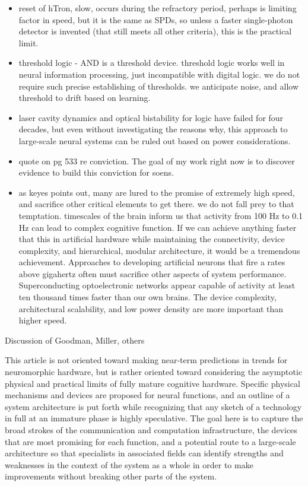 \begin{itemize}
\item reset of hTron, slow, occurs during the refractory period, perhaps is limiting factor in speed, but it is the same as SPDs, so unless a faster single-photon detector is invented (that still meets all other criteria), this is the practical limit.
\item threshold logic - AND is a threshold device. threshold logic works well in neural information processing, just incompatible with digital logic. we do not require such precise establishing of thresholds. we anticipate noise, and allow threshold to drift based on learning. 
\item laser cavity dynamics and optical bistability for logic have failed for four decades, but even without investigating the reasons why, this approach to large-scale neural systems can be ruled out based on power considerations. 
\item \cite{ke1985b} quote on pg 533 re conviction. The goal of my work right now is to discover evidence to build this conviction for soens.
\item as keyes points out, many are lured to the promise of extremely high speed, and sacrifice other critical elements to get there. we do not fall prey to that temptation. timescales of the brain inform us that activity from 100 Hz to 0.1 Hz can lead to complex cognitive function. If we can achieve anything faster that this in artificial hardware while maintaining the connectivity, device complexity, and hierarchical, modular architecture, it would be a tremendous achievement. Approaches to developing artificial neurons that fire a rates above gigahertz often must sacrifice other aspects of system performance. Superconducting optoelectronic networks appear capable of activity at least ten thousand times faster than our own brains. The device complexity, architectural scalability, and low power density are more important than higher speed. 
\end{itemize}

\vspace{3em}
Discussion of Goodman, Miller, others

\vspace{3em}
This article is not oriented toward making near-term predictions in trends for neuromorphic hardware, but is rather oriented toward considering the asymptotic physical and practical limits of fully mature cognitive hardware. Specific physical mechanisms and devices are proposed for neural functions, and an outline of a system architecture is put forth while recognizing that any sketch of a technology in full at an immature phase is highly speculative. The goal here is to capture the broad strokes of the communication and computation infrastructure, the devices that are most promising for each function, and a potential route to a large-scale architecture so that specialists in associated fields can identify strengths and weaknesses in the context of the system as a whole in order to make improvements without breaking other parts of the system.